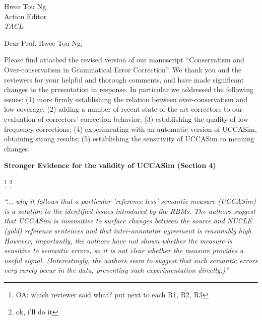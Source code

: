 \documentclass[11pt,letterpaper]{letter}
\newcommand{\oa}[1]{\footnote{\color{red}OA: #1}}
\begin{document}
\begin{letter}{%
Hwee Tou Ng\\
Action Editor\\
{\em TACL}\\
}



\vspace{.5cm}

  \opening{Dear Prof. Hwee Tou Ng,}


\vspace{.5cm}
  
  Please find attached the revised version of our manuscript ``Conservatism and Over-conservatism in Grammatical Error Correction''. We thank you and the reviewers for your helpful and thorough comments, and have made significant changes to the presentation in response. In particular we addressed the following issues: (1) more firmly establishing the relation between over-conservatism and low coverage; (2) adding a number of recent state-of-the-art correctors to our evaluation of correctors' correction behavior; (3) establishing the quality of low frequency corrections; (4) experimenting with an automatic version of UCCASim, obtaining strong results; (5) establishing the sensitivity of UCCASim to meaning changes.

\vspace{.5cm}

{\large\bf Stronger Evidence for the validity of UCCASim (Section 4)}

\oa{which reviewer said what? put next to each R1, R2, R3} \footnote{ok, i'll do it}

\emph{``... why it follows that a
	particular 'reference-less' semantic measure (UCCASim) is a solution to the
	identified issues introduced by the RBMs. The authors suggest that UCCASim
	is insensitive to surface changes between the source and NUCLE (gold)
	reference sentences and that inter-annotator agreement is reasonably high.
	However, importantly, the authors have not shown whether the measure is
	sensitive to semantic errors, so it is not clear whether the measure
	provides a useful signal. (Interestingly, the authors seem to suggest that
	such semantic errors very rarely occur in the data, preventing such
	experimentation directly.)''
}


\end{letter}
\end{document}

